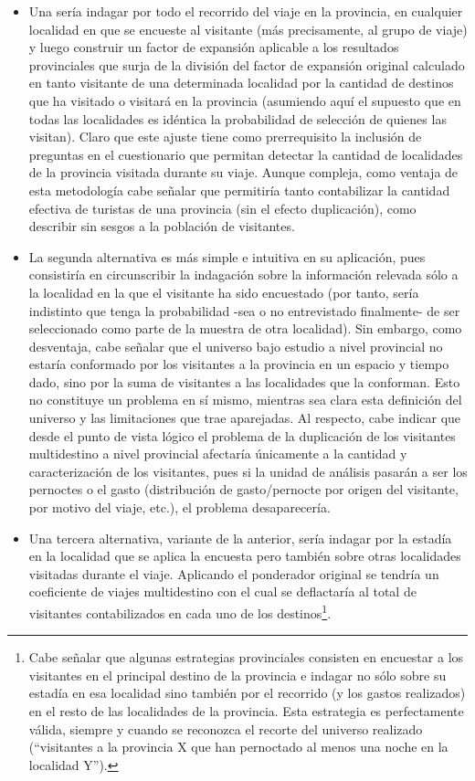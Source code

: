 \documentclass[
]{book}
\begin{document}
\begin{itemize}
\item
  Una sería indagar por todo el recorrido del viaje en la provincia, en cualquier localidad en que se encueste al visitante (más precisamente, al grupo de viaje) y luego construir un factor de expansión aplicable a los resultados provinciales que surja de la división del factor de expansión original calculado en tanto visitante de una determinada localidad por la cantidad de destinos que ha visitado o visitará en la provincia (asumiendo aquí el supuesto que en todas las localidades es idéntica la probabilidad de selección de quienes las visitan). Claro que este ajuste tiene como prerrequisito la inclusión de preguntas en el cuestionario que permitan detectar la cantidad de localidades de la provincia visitada durante su viaje. Aunque compleja, como ventaja de esta metodología cabe señalar que permitiría tanto contabilizar la cantidad efectiva de turistas de una provincia (sin el efecto duplicación), como describir sin sesgos a la población de visitantes.
\item
  La segunda alternativa es más simple e intuitiva en su aplicación, pues consistiría en circunscribir la indagación sobre la información relevada sólo a la localidad en la que el visitante ha sido encuestado (por tanto, sería indistinto que tenga la probabilidad -sea o no entrevistado finalmente- de ser seleccionado como parte de la muestra de otra localidad). Sin embargo, como desventaja, cabe señalar que el universo bajo estudio a nivel provincial no estaría conformado por los visitantes a la provincia en un espacio y tiempo dado, sino por la suma de visitantes a las localidades que la conforman. Esto no constituye un problema en sí mismo, mientras sea clara esta definición del universo y las limitaciones que trae aparejadas. Al respecto, cabe indicar que desde el punto de vista lógico el problema de la duplicación de los visitantes multidestino a nivel provincial afectaría únicamente a la cantidad y caracterización de los visitantes, pues si la unidad de análisis pasarán a ser los pernoctes o el gasto (distribución de gasto/pernocte por origen del visitante, por motivo del viaje, etc.), el problema desaparecería.
\item
  Una tercera alternativa, variante de la anterior, sería indagar por la estadía en la localidad que se aplica la encuesta pero también sobre otras localidades visitadas durante el viaje. Aplicando el ponderador original se tendría un coeficiente de viajes multidestino con el cual se deflactaría al total de visitantes contabilizados en cada uno de los destinos\footnote{Cabe señalar que algunas estrategias provinciales consisten en encuestar a los visitantes en el principal destino de la provincia e indagar no sólo sobre su estadía en esa localidad sino también por el recorrido (y los gastos realizados) en el resto de las localidades de la provincia. Esta estrategia es perfectamente válida, siempre y cuando se reconozca el recorte del universo realizado (``visitantes a la provincia X que han pernoctado al menos una noche en la localidad Y'').}.
\end{itemize}
\end{document}
